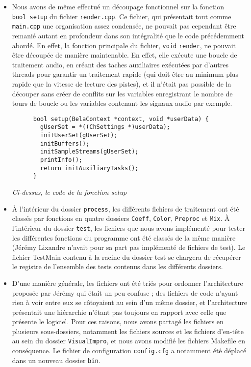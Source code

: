 \begin{itemize}
 \item Nous avons de même effectué un découpage fonctionnel sur la
       fonction \\ \verb!bool setup!  du fichier \verb!render.cpp!. Ce
       fichier, qui présentait tout comme \verb!main.cpp! une
       organisation assez condensée, ne pouvait pas cependant être
       remanié autant en profondeur dans son intégralité que le code
       précédemment abordé. En effet, la fonction principale du
       fichier, \verb!void!  \verb!render!, ne pouvait être découpée de
       manière maintenable. En effet, elle exécute une boucle de
       traitement audio, en créant des taches auxiliaires exécutées par
       d'autres threads pour garantir un traitement rapide (qui doit
       être au minimum plus rapide que la vitesse de lecture des
       pistes), et il n'était pas possible de la découper sans créer de
       conflits sur les variables enregistrant le nombre de tours de
       boucle ou les variables contenant les signaux audio par exemple.
       
       \begin{lstlisting}
      bool setup(BelaContext *context, void *userData) {
        gUserSet = *((ChSettings *)userData);
        initUserSet(gUserSet);
        initBuffers();
        initSampleStreams(gUserSet);
        printInfo();
        return initAuxiliaryTasks();
      }
 \end{lstlisting}
 
 \begin{center}
  \textit{Ci-dessus, le code de la fonction setup}
 \end{center}
 
 \item \`{A} l'intérieur du dossier \verb!process!, les
       différents fichiers de traitement ont été classés par
       fonctions en quatre dossiers \verb!Coeff!, \verb!Color!,
       \verb!Preproc! et \verb!Mix!. \`{A} l'intérieur du dossier
       \verb!test!, les fichiers que nous avons implémenté pour tester les
       différentes fonctions du programme ont été classés de la même
       manière (Jérémy Lixandre n'avait pour sa part pas implémenté
       de fichiers de test). Le fichier TestMain contenu à la racine du
       dossier test se chargera de récupérer le registre de l'ensemble
       des tests contenus dans les différents dossiers.
       
 \item D'une manière générale, les fichiers ont été triés pour
       ordonner l'architecture proposée par Jérémy qui était un peu
       confuse ; des fichiers de code n'ayant rien à voir entre eux
       se côtoyaient au sein d'un même dossier, et l'architecture
       présentait une hiérarchie n'étant pas toujours en rapport
       avec celle que présente le logiciel. Pour ces raisons, nous
       avons partagé les fichiers en plusieurs sous-dossiers,
       notamment les fichiers sources et les fichiers d'en-tête au
       sein du dossier \verb!VisualImpro!, et nous avons modifié
       les fichiers Makefile en conséquence. Le fichier de
       configuration \verb!config.cfg! a notamment été déplacé dans
       un nouveau dossier \verb!bin!.
       

\end{itemize}
